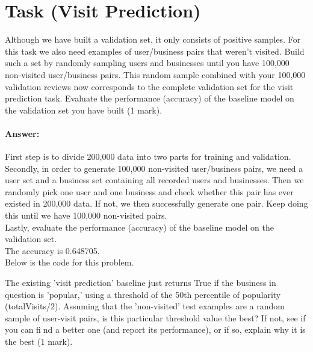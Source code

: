 \documentclass{assignment}
\date{November 10, 2017}
\begin{document}
\section{Task (Visit Prediction)}

\begin{problemlist}

\pbitem 
Although we have built a validation set, it only consists of positive samples. For this task we also need examples of user/business pairs that weren't visited. Build such a set by randomly sampling users and businesses until you have 100,000 non-visited user/business pairs. This random sample combined with your 100,000 validation reviews now corresponds to the complete validation set for the visit prediction task. Evaluate the performance (accuracy) of the baseline model on the validation set you have built (1 mark).

\paragraph{Answer:}
\par
First step is to divide 200,000 data into two parts for training and validation.\\
Secondly, in order to generate 100,000 non-visited user/business pairs, we need a user set and a business set containing all recorded users and businesses. Then we randomly pick one user and one business and check whether this pair has ever existed in 200,000 data. If not, we then successfully generate one pair. Keep doing this until we have 100,000 non-visited pairs.\\
Lastly, evaluate the performance (accuracy) of the baseline model on the validation set.\\
The accuracy is 0.648705.\\
Below is the code for this problem.


\newpage

\pbitem 
The existing 'visit prediction' baseline just returns True if the business in question is 'popular,' using
a threshold of the 50th percentile of popularity (totalVisits/2). Assuming that the 'non-visited' test
examples are a random sample of user-visit pairs, is this particular threshold value the best? If not, see
if you can find a better one (and report its performance), or if so, explain why it is the best (1 mark).


\end{problemlist}
\end{document}
